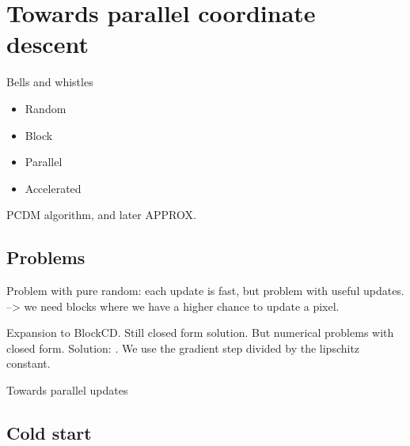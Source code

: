 \section{Towards parallel coordinate descent}

Bells and whistles

\begin{itemize}
	\item Random
	\item Block
	\item Parallel
	\item Accelerated
\end{itemize}

PCDM algorithm, and later APPROX.

\subsection{Problems}
Problem with pure random: each update is fast, but problem with useful updates. --> we need blocks where we have a higher chance to update a pixel.

Expansion to BlockCD. Still closed form solution. But numerical problems with closed form. Solution: \cite{richtarik2014iteration}. We use the gradient step divided by the lipschitz constant.

Towards parallel updates

\subsection{Cold start}


